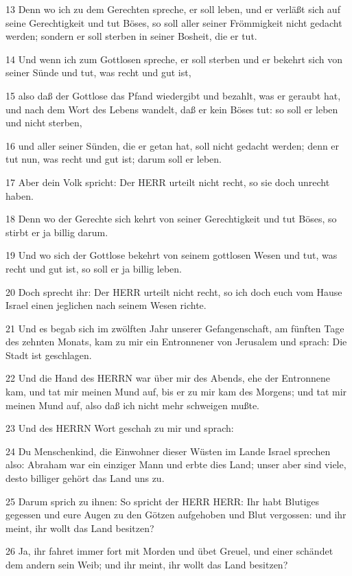 \par 13 Denn wo ich zu dem Gerechten spreche, er soll leben, und er verläßt sich auf seine Gerechtigkeit und tut Böses, so soll aller seiner Frömmigkeit nicht gedacht werden; sondern er soll sterben in seiner Bosheit, die er tut.
\par 14 Und wenn ich zum Gottlosen spreche, er soll sterben und er bekehrt sich von seiner Sünde und tut, was recht und gut ist,
\par 15 also daß der Gottlose das Pfand wiedergibt und bezahlt, was er geraubt hat, und nach dem Wort des Lebens wandelt, daß er kein Böses tut: so soll er leben und nicht sterben,
\par 16 und aller seiner Sünden, die er getan hat, soll nicht gedacht werden; denn er tut nun, was recht und gut ist; darum soll er leben.
\par 17 Aber dein Volk spricht: Der HERR urteilt nicht recht, so sie doch unrecht haben.
\par 18 Denn wo der Gerechte sich kehrt von seiner Gerechtigkeit und tut Böses, so stirbt er ja billig darum.
\par 19 Und wo sich der Gottlose bekehrt von seinem gottlosen Wesen und tut, was recht und gut ist, so soll er ja billig leben.
\par 20 Doch sprecht ihr: Der HERR urteilt nicht recht, so ich doch euch vom Hause Israel einen jeglichen nach seinem Wesen richte.
\par 21 Und es begab sich im zwölften Jahr unserer Gefangenschaft, am fünften Tage des zehnten Monats, kam zu mir ein Entronnener von Jerusalem und sprach: Die Stadt ist geschlagen.
\par 22 Und die Hand des HERRN war über mir des Abends, ehe der Entronnene kam, und tat mir meinen Mund auf, bis er zu mir kam des Morgens; und tat mir meinen Mund auf, also daß ich nicht mehr schweigen mußte.
\par 23 Und des HERRN Wort geschah zu mir und sprach:
\par 24 Du Menschenkind, die Einwohner dieser Wüsten im Lande Israel sprechen also: Abraham war ein einziger Mann und erbte dies Land; unser aber sind viele, desto billiger gehört das Land uns zu.
\par 25 Darum sprich zu ihnen: So spricht der HERR HERR: Ihr habt Blutiges gegessen und eure Augen zu den Götzen aufgehoben und Blut vergossen: und ihr meint, ihr wollt das Land besitzen?
\par 26 Ja, ihr fahret immer fort mit Morden und übet Greuel, und einer schändet dem andern sein Weib; und ihr meint, ihr wollt das Land besitzen?
